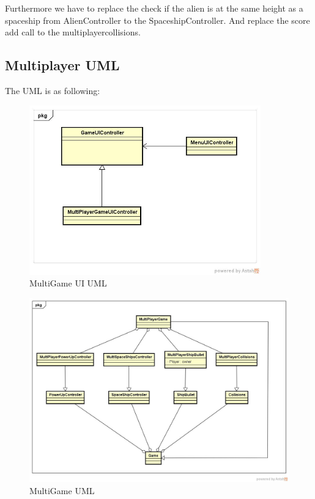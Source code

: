 Furthermore we have to replace the check if the alien is at the same height as a spaceship from AlienController to the SpaceshipController. \newline
And replace the score add call to the multiplayercollisions.
\newpage
\subsection{Multiplayer UML}
The UML is as following:
\begin{figure}[ht!]
	\centering
	\includegraphics[width=10cm]{GameUI.jpg}
	\caption{MultiGame UI UML}
	\label{fig:1-1MultiGameUI}
\end{figure}
\begin{figure}[ht!]
	\centering
	\includegraphics[width=15cm]{MultiGame.jpg}
	\caption{MultiGame UML}
	\label{fig:1-1MultiGameGame}
\end{figure}
